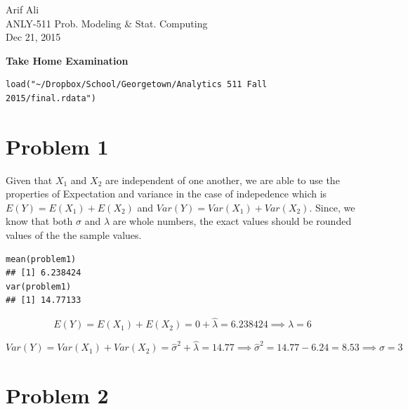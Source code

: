 \documentclass{article}\usepackage[]{graphicx}\usepackage[]{color}
\makeatletter
\newenvironment{kframe}{%
 \def\at@end@of@kframe{}%
 \ifinner\ifhmode%
  \def\at@end@of@kframe{\end{minipage}}%
  \begin{minipage}{\columnwidth}%
 \fi\fi%
 \def\FrameCommand##1{\hskip\@totalleftmargin \hskip-\fboxsep
 \colorbox{shadecolor}{##1}\hskip-\fboxsep
     \hskip-\linewidth \hskip-\@totalleftmargin \hskip\columnwidth}%
 \MakeFramed {\advance\hsize-\width
   \@totalleftmargin\z@ \linewidth\hsize
   \@setminipage}}%
 {\par\unskip\endMakeFramed%
 \at@end@of@kframe}
\newenvironment{knitrout}{}{} %
\makeatother
\begin{document}
\begin{flushright}
  Arif Ali\\
  ANLY-511 Prob. Modeling \& Stat. Computing\\
	Dec 21, 2015\\
\end{flushright}

\begin{center}
  \LARGE\textbf{Take Home Examination}
\end{center}
\begin{knitrout}
\color{fgcolor}\begin{kframe}
\begin{verbatim}
load("~/Dropbox/School/Georgetown/Analytics 511 Fall 2015/final.rdata")
\end{verbatim}
\end{kframe}
\end{knitrout}

\section*{Problem 1}
Given that $X_{1}$ and $X_{2}$ are independent of one another, we are able to use the properties of Expectation and variance in the case of indepedence which is $E(Y)=E(X_{1})+E(X_{2})$ and $Var(Y)=Var(X_{1})+Var(X_{2})$. Since, we know that both $\sigma$ and $\lambda$ are whole numbers, the exact values should be rounded values of the the sample values. 
\begin{knitrout}
\color{fgcolor}\begin{kframe}
\begin{verbatim}
mean(problem1)
## [1] 6.238424
var(problem1)
## [1] 14.77133
\end{verbatim}
\end{kframe}
\end{knitrout}

\begin{equation}
E(Y)=E(X_{1})+E(X_{2})=0+\hat\lambda=6.238424 \implies \lambda = 6
\end{equation}

\begin{equation}
Var(Y)=Var(X_{1})+Var(X_{2})=\hat\sigma^2+\hat\lambda=14.77 \implies \hat\sigma^2 = 14.77 - 6.24 = 8.53 \implies \sigma = 3
\end{equation}

\section*{Problem 2}
\end{document}
